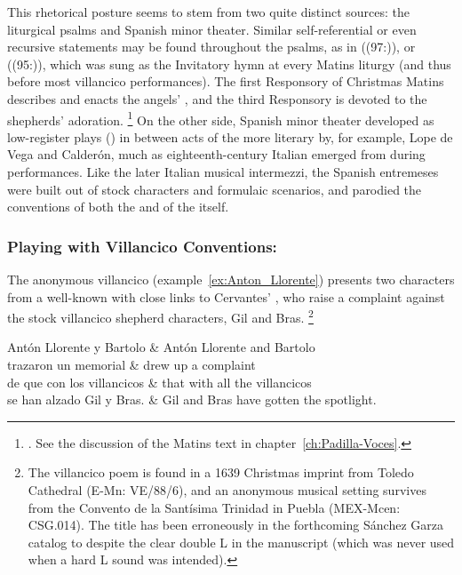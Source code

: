 This rhetorical posture seems to stem from two quite distinct sources: the liturgical psalms and Spanish minor theater.
Similar self-referential or even recursive statements may be found throughout the psalms, as in  ((97:)), or  ((95:)), which was sung as the Invitatory hymn at every Matins liturgy (and thus before most villancico performances). 
The first Responsory of Christmas Matins describes and enacts the angels' , and the third Responsory is devoted to the shepherds' adoration.%
	\footnote{%
	\autocite[172--173]{Catholic:Breviarium1631}.
	See the discussion of the Matins text in chapter~\ref{ch:Padilla-Voces}.
	}
On the other side, Spanish minor theater developed as low-register plays () in between acts of the more literary  by, for example, Lope de Vega and Calderón, much as eighteenth-century Italian  emerged from  during  performances.
Like the later Italian musical intermezzi, the Spanish entremeses were built out of stock characters and formulaic scenarios, and parodied the conventions of both the  and of the  itself.

\subsubsection{Playing with Villancico Conventions: }

The anonymous villancico  (example~\ref{ex:Anton_Llorente}) presents two characters from a well-known  with close links to Cervantes' , who raise a complaint against the stock villancico shepherd characters, Gil and Bras.%
	\footnote{%
The villancico poem is found in a 1639 Christmas imprint from Toledo Cathedral (E-Mn: VE/88/6), and an anonymous musical setting survives from the Convento de la Santísima Trinidad in Puebla (MEX-Mcen: CSG.014).
The title has been erroneously  in the forthcoming Sánchez Garza catalog to  despite the clear double L in the manuscript (which was never used when a hard L sound was intended).
	}

\begin{quotepoem}
%
Antón Llorente y Bartolo	& Antón Llorente and Bartolo\\
trazaron un memorial		& drew up a complaint\\
de que con los villancicos	& that with all the villancicos\\
se han alzado Gil y Bras.	& Gil and Bras have gotten the spotlight.\\
%
\end{quotepoem}

